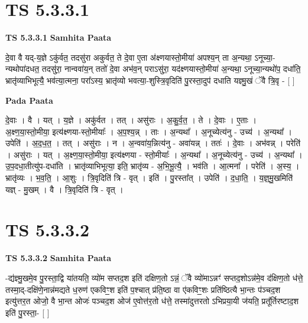 \documentclass[17pt]{extarticle}
\begin{document}
\section*{ TS 5.3.3.1 }

\textbf{TS 5.3.3.1 } \newline
\textbf{Samhita Paata} \newline

दे॒वा वै यद्-य॒ज्ञे ऽकु॑र्वत॒ तदसु॑रा अकुर्वत॒ ते दे॒वा ए॒ता अ॑क्ष्णयास्तो॒मीया॑ अपश्य॒न् ता अ॒न्यथा॒ ऽनूच्या॒-न्यथोपा॑दधत॒ तदसु॑रा॒ नान्ववा॑य॒न् ततो॑ दे॒वा अभ॑व॒न् पराऽसु॑रा॒ यद॑क्ष्णयास्तो॒मीया॑ अ॒न्यथा॒ ऽनूच्या॒न्यथो॑प॒ दधा॑ति॒ भ्रातृ॑व्याभिभूत्यै॒ भव॑त्या॒त्मना॒ परा᳚ऽस्य॒ भ्रातृ॑व्यो भवत्या॒-शुस्त्रि॒वृदिति॑ पु॒रस्ता॒दुप॑ दधाति यज्ञ्मु॒खं ॅवै त्रि॒वृ - [  ] \newline

\textbf{Pada Paata} \newline

दे॒वाः । वै । यत् । य॒ज्ञे । अकु॑र्वत । तत् । असु॑राः । अ॒कु॒र्व॒त॒ । ते । दे॒वाः । ए॒ताः । अ॒क्ष्ण॒या॒स्तो॒मीया॒ इत्य॑क्ष्णया-स्तो॒मीयाः᳚ । अ॒प॒श्य॒न्न् । ताः । अ॒न्यथा᳚ । अ॒नूच्येत्य॑नु - उच्य॑ । अ॒न्यथा᳚ । उपेति॑ । अ॒द॒ध॒त॒ । तत् । असु॑राः । न । अ॒न्ववा॑य॒न्नित्य॑नु - अवा॑यन्न् । ततः॑ । दे॒वाः । अभ॑वन्न् । परेति॑ । असु॑राः । यत् । अ॒क्ष्ण॒या॒स्तो॒मीया॒ इत्य॑क्ष्णया - स्तो॒मीयाः᳚ । अ॒न्यथा᳚ । अ॒नूच्येत्य॑नु - उच्य॑ । अ॒न्यथा᳚ । उ॒प॒दधा॒तीत्यु॑प-दधा॑ति । भ्रातृ॑व्याभिभूत्या॒ इति॒ भ्रातृ॑व्य - अ॒भि॒भू॒त्यै॒ । भव॑ति । आ॒त्मना᳚ । परेति॑ । अ॒स्य॒ । भ्रातृ॑व्यः । भ॒व॒ति॒ । आ॒शुः । त्रि॒वृदिति॑ त्रि - वृत् । इति॑ । पु॒रस्ता᳚त् । उपेति॑ । द॒धा॒ति॒ । य॒ज्ञ्॒मु॒खमिति॑ यज्ञ् - मु॒खम् । वै । त्रि॒वृदिति॑ त्रि - वृत् ।  \newline




\section*{ TS 5.3.3.2 }

\textbf{TS 5.3.3.2 } \newline
\textbf{Samhita Paata} \newline

-द्य॑ज्ञ्मु॒खमे॒व पु॒रस्ता॒द्वि या॑तयति॒ व्यो॑म सप्तद॒श इति॑ दक्षिण॒तो ऽन्नं॒ ॅवै व्यो॑माऽन्नꣳ॑ सप्तद॒शोऽन्न॑मे॒व द॑क्षिण॒तो ध॑त्ते॒ तस्मा॒द्-दक्षि॑णे॒नान्न॑मद्यते ध॒रुण॑ एकविꣳ॒॒श इति॑ प॒श्चात् प्र॑ति॒ष्ठा वा ए॑कविꣳ॒॒शः प्रति॑ष्ठित्यै भा॒न्तः प॑ञ्चद॒श इत्यु॑त्तर॒त ओजो॒ वै भा॒न्त ओजः॑ पञ्चद॒श ओज॑ ए॒वोत्त॑र॒तो ध॑त्ते॒ तस्मा॑दुत्तरतो ऽभिप्रया॒यी ज॑यति॒ प्रतू᳚र्तिरष्टाद॒श इति॑ पु॒रस्ता॒- [  ] \newline
\end{document}
